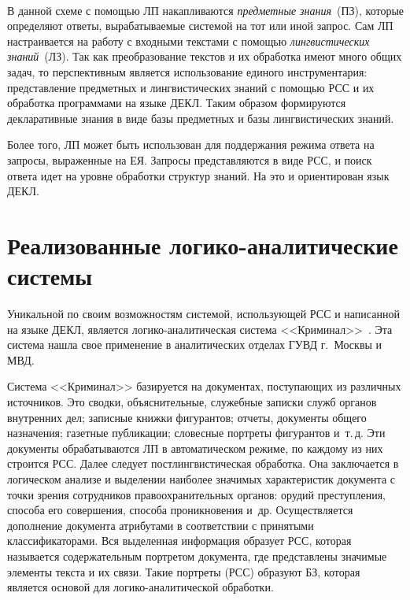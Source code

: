 \begin{multicols}{2}
\begin{figure*} %
\vspace*{1pt}
\begin{center}
\mbox{%
\epsfxsize=148.465mm
}
\end{center}
\vspace*{-9pt}
\end{figure*}


 В данной схеме с помощью ЛП накапливаются
\textit{предметные знания}~(ПЗ), которые определяют ответы,
вырабатываемые системой на тот или иной запрос. Сам
ЛП настраивается на работу с входными текстами с помощью
\textit{лингвистических знаний}~(ЛЗ). Так как преобразование текстов и их
обработка имеют много общих задач, то перспективным является
использование единого инструментария: представление предметных и
лингвистических знаний с помощью РСС и их обработка программами на языке
ДЕКЛ. Таким образом формируются декларативные знания в виде базы
предметных и базы лингвистических знаний.

 Более того, ЛП может быть использован для
поддержания режима ответа на запросы, выраженные на
ЕЯ. Запросы представляются в виде РСС, и поиск ответа идет на уровне
обработки структур знаний. На это и ориентирован язык ДЕКЛ.


\vspace*{-6pt}

\section{Реализованные логико-аналитические системы} %

 Уникальной по своим возможностям системой, использующей РСС и
написанной на языке ДЕКЛ, является ло\-ги\-ко-ана\-ли\-ти\-че\-ская система
<<Криминал>>~\cite{ma-l7, ma-l8}. Эта система нашла свое применение в
аналитических отделах ГУВД г.~Москвы и МВД.

 Система <<Криминал>> базируется на документах, поступающих из
различных источников. Это сводки, объяснительные, служебные записки служб
органов внутренних дел; записные книжки фигурантов; отчеты, документы
общего назначения; газетные публикации; словесные портреты фигурантов
и~т.\,д. Эти документы обрабатываются ЛП в
автоматическом режиме, по каждому из них строится РСС. Далее следует
постлингвистическая обработка. Она заключается в логическом анализе и
выделении наиболее значимых характеристик документа с точки зрения
сотрудников правоохранительных органов: орудий преступления, способа его
совершения, способа проникновения и~др. Осуществляется дополнение
документа атрибутами в соответствии с принятыми классификаторами. Вся
выделенная информация образует РСС, которая называется содержательным
портретом документа, где представлены значимые элементы текста и их связи.
Такие портреты (РСС) образуют БЗ, которая является основой для
ло\-ги\-ко-ана\-ли\-ти\-че\-ской обработки.


\end{multicols}
